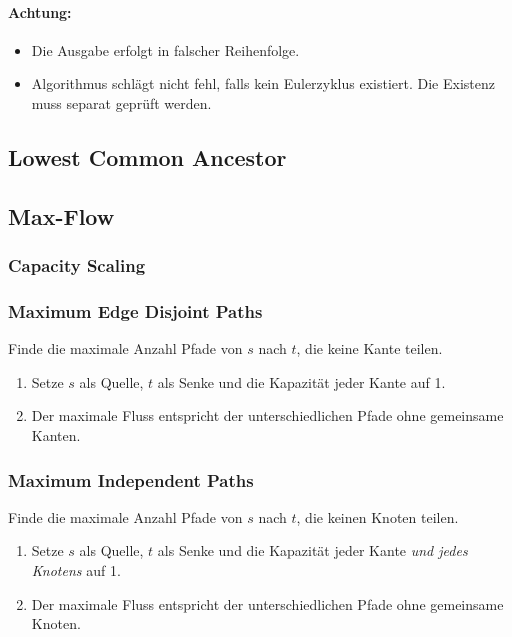 \paragraph{Achtung:}
\begin{itemize}
	\item Die Ausgabe erfolgt in falscher Reihenfolge.
	\item Algorithmus schlägt nicht fehl, falls kein Eulerzyklus existiert.
	Die Existenz muss separat geprüft werden.
\end{itemize}

\subsection{Lowest Common Ancestor}


\subsection{Max-Flow}

\subsubsection{Capacity Scaling}


\subsubsection{Maximum Edge Disjoint Paths}
Finde die maximale Anzahl Pfade von $s$ nach $t$, die keine Kante teilen.
\begin{enumerate}
	\item Setze $s$ als Quelle, $t$ als Senke und die Kapazität jeder Kante auf 1.
	\item Der maximale Fluss entspricht der unterschiedlichen Pfade ohne gemeinsame Kanten.
\end{enumerate}

\subsubsection{Maximum Independent Paths}
Finde die maximale Anzahl Pfade von $s$ nach $t$, die keinen Knoten teilen.
\begin{enumerate}
	\item Setze $s$ als Quelle, $t$ als Senke und die Kapazität jeder Kante \emph{und jedes Knotens} auf 1.
	\item Der maximale Fluss entspricht der unterschiedlichen Pfade ohne gemeinsame Knoten.
\end{enumerate}

